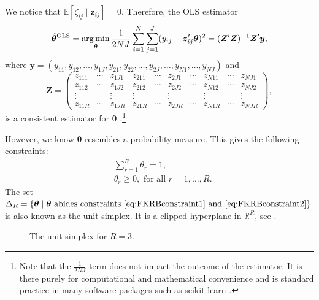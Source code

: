We notice that $\mathbb{E}[\zeta_{ij}\mid \bm{z}_{ij}] = 0$. Therefore, the OLS estimator
\begin{equation}
\label{eq:FKRBOLSest}
    \hat{\bm{\theta}}^\mathrm{OLS} = \operatorname*{arg\,min}_{\bm{\theta}}{\frac{1}{2NJ}\sum_{i=1}^{N}\sum_{j=1}^{J}(y_{ij}-\bm{z}^\prime_{ij}\bm{\theta})^2} = (\bm{Z}'\bm{Z})^{-1}\bm{Z}'\bm{y},
\end{equation}
where $\bm{y} = (y_{11}, y_{12}, \ldots, y_{1J}, y_{21}, y_{22}, \ldots, y_{2J}, \ldots, y_{N1},\ldots, y_{NJ})$ and
\begin{equation}
\label{eq:FKRBZdef}
    \bm{Z} = \begin{pmatrix}
    z_{111} & \cdots & z_{1J1} & z_{211} & \cdots & z_{2J1} & \cdots & z_{N11} & \cdots & z_{NJ1} \\
    z_{112} & \cdots & z_{1J2} & z_{212} & \cdots & z_{2J2} & \cdots & z_{N12} & \cdots & z_{NJ2} \\
    \vdots  &        & \vdots  & \vdots  &        & \vdots  &        & \vdots  &        & \vdots  \\
    z_{11R} & \cdots & z_{1JR} & z_{21R} & \cdots & z_{2JR} & \cdots & z_{N1R} & \cdots & z_{NJR}
    \end{pmatrix},
\end{equation}
is a consistent estimator for $\bm{\theta}$ \citep{FoxKimRyanBajari2011}.\footnote{Note that the $\frac{1}{2NJ}$ term does not impact the outcome of the estimator. It is there purely for computational and mathematical convenience and is standard practice in many software packages such as scikit-learn \citep{scikitlearn2011}.}

However, we know $\bm{\theta}$ resembles a probability measure. 
This gives the following constraints:
\begin{align}
\label{eq:FKRBconstraint1}
    &\sum_{r=1}^{R}\theta_r = 1, \\
\label{eq:FKRBconstraint2}
    &\theta_r \geq 0, \text{ for all } r = 1,\ldots,R.
\end{align}
The set $\Delta_R = \{\bm{\theta}\mid \bm{\theta} \text{ abides constraints \cref{eq:FKRBconstraint1} and \cref{eq:FKRBconstraint2}}\}$ is also known as the unit simplex.
It is a clipped hyperplane in $\mathbb{R}^R$, see .
\begin{figure}[t]
    \centering
    
    \caption{The unit simplex for $R=3$.}
    \label{fig:unit_simplex}
\end{figure}

